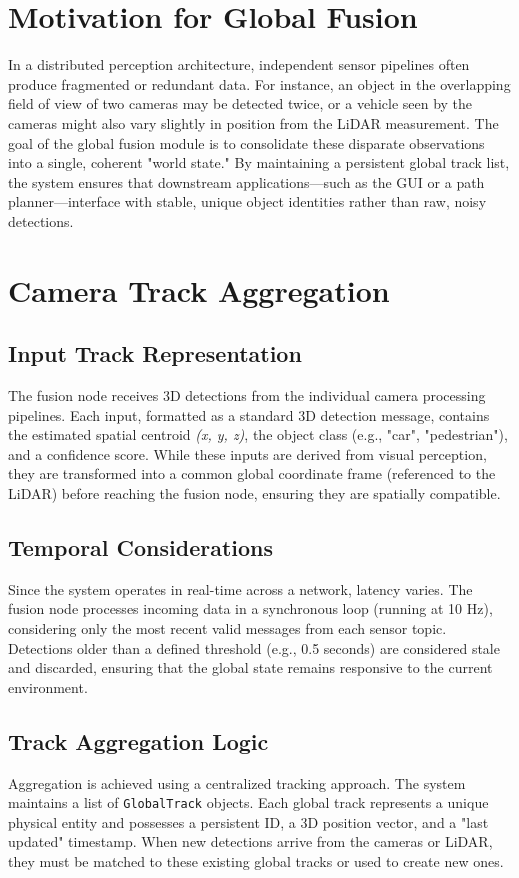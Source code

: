 \documentclass[12pt,a4paper]{report}
\begin{document}
{\section{Motivation for Global Fusion}
In a distributed perception architecture, independent sensor pipelines often produce fragmented or redundant data. For instance, an object in the overlapping field of view of two cameras may be detected twice, or a vehicle seen by the cameras might also vary slightly in position from the LiDAR measurement. The goal of the global fusion module is to consolidate these disparate observations into a single, coherent "world state." By maintaining a persistent global track list, the system ensures that downstream applications—such as the GUI or a path planner—interface with stable, unique object identities rather than raw, noisy detections.

\section{Camera Track Aggregation}

\subsection{Input Track Representation}
The fusion node receives 3D detections from the individual camera processing pipelines. Each input, formatted as a standard 3D detection message, contains the estimated spatial centroid \textit{(x, y, z)}, the object class (e.g., "car", "pedestrian"), and a confidence score. While these inputs are derived from visual perception, they are transformed into a common global coordinate frame (referenced to the LiDAR) before reaching the fusion node, ensuring they are spatially compatible.

\subsection{Temporal Considerations}
Since the system operates in real-time across a network, latency varies. The fusion node processes incoming data in a synchronous loop (running at 10 Hz), considering only the most recent valid messages from each sensor topic. Detections older than a defined threshold (e.g., 0.5 seconds) are considered stale and discarded, ensuring that the global state remains responsive to the current environment.

\subsection{Track Aggregation Logic}
Aggregation is achieved using a centralized tracking approach. The system maintains a list of \texttt{GlobalTrack} objects. Each global track represents a unique physical entity and possesses a persistent ID, a 3D position vector, and a "last updated" timestamp. When new detections arrive from the cameras or LiDAR, they must be matched to these existing global tracks or used to create new ones.

}
\end{document}
